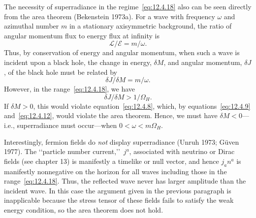 The necessity of superradiance in the regime~\eqref{eq:12.4.18} also can be seen
directly from the area theorem (Bekenstein 1973a). For a wave with frequency
\(\omega\) and azimuthal number \(m\) in a stationary axisymmetric background, the
ratio of angular momentum flux to energy flux at infinity is
\begin{equation}
 \mathcal L/\mathcal E=m/\omega .
 \tag{12.4.22}\label{eq:12.4.22}
\end{equation}
Thus, by conservation of energy and angular momentum, when such a wave is
incident upon a black hole, the change in energy, \(\delta M\), and angular momentum,
\(\delta J\), of the black hole must be related by
\begin{equation}
 \delta J/\delta M=m/\omega .
 \tag{12.4.23}\label{eq:12.4.23}
\end{equation}
However, in the range~\eqref{eq:12.4.18}, we have
\begin{equation}
 \delta J/\delta M>1/\Omega_H .
 \tag{12.4.24}\label{eq:12.4.24}
\end{equation}
If \(\delta M>0\), this would violate equation~\eqref{eq:12.4.8}, which, by
equations~\eqref{eq:12.4.9} and~\eqref{eq:12.4.12}, would violate the area theorem.
Hence, we must have \(\delta M<0\)---i.e., superradiance must occur---when
\(0<\omega<m\Omega_H\).

Interestingly, fermion fields do \emph{not} display superradiance (Unruh 1973;
G\"uven 1977). The \lq\lq particle number current,\rq\rq\ \(j^a\), associated with
neutrino or Dirac fields (see chapter 13) is manifestly a timelike or null vector, and
hence \(j_an^a\) is manifestly nonnegative on the horizon for all waves including
those in the range~\eqref{eq:12.4.18}. Thus, the reflected wave never has larger
amplitude than the incident wave. In this case the argument given in the previous
paragraph is inapplicable because the stress tensor of these fields fails to satisfy the
weak energy condition, so the area theorem does not hold.


